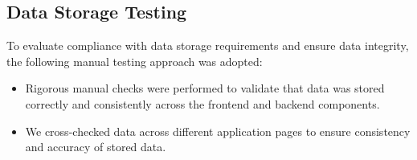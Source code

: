\subsection{Data Storage Testing}
To evaluate compliance with data storage requirements and ensure data integrity, the following manual testing approach was adopted:
\begin{itemize}
    \item Rigorous manual checks were performed to validate that data was stored correctly and consistently across the frontend and backend components.
    \item We cross-checked data across different application pages to ensure consistency and accuracy of stored data.
\end{itemize}
